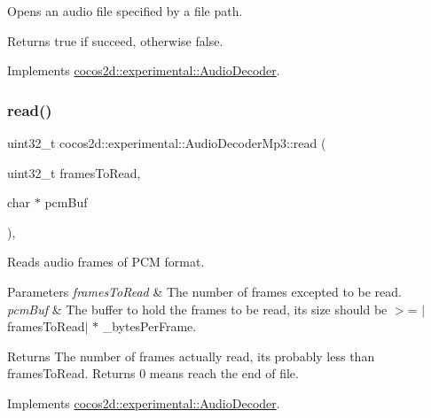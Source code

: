 Opens an audio file specified by a file path. 

\begin{DoxyReturn}{Returns}
true if succeed, otherwise false. 
\end{DoxyReturn}


Implements \hyperlink{classcocos2d_1_1experimental_1_1AudioDecoder_a27747e5f9671a16852997fe852e28e71}{cocos2d\+::experimental\+::\+Audio\+Decoder}.

\mbox{\label{classcocos2d_1_1experimental_1_1AudioDecoderMp3_a9b033167139ff6d094fe27d79a2b78ad}} 
\subsubsection{\texorpdfstring{read()}{read()}}
{\footnotesize\ttfamily uint32\+\_\+t cocos2d\+::experimental\+::\+Audio\+Decoder\+Mp3\+::read (\begin{DoxyParamCaption}\item[{uint32\+\_\+t}]{frames\+To\+Read,  }\item[{char $\ast$}]{pcm\+Buf }\end{DoxyParamCaption})\hspace{0.3cm}{\ttfamily [override]}, {\ttfamily [virtual]}}



Reads audio frames of P\+CM format. 


\begin{DoxyParams}{Parameters}
{\em frames\+To\+Read} & The number of frames excepted to be read. \\
\hline
{\em pcm\+Buf} & The buffer to hold the frames to be read, its size should be $>$= $\vert$frames\+To\+Read$\vert$ $\ast$ \+\_\+bytes\+Per\+Frame. \\
\hline
\end{DoxyParams}
\begin{DoxyReturn}{Returns}
The number of frames actually read, it\textquotesingle{}s probably less than \textquotesingle{}frames\+To\+Read\textquotesingle{}. Returns 0 means reach the end of file. 
\end{DoxyReturn}


Implements \hyperlink{classcocos2d_1_1experimental_1_1AudioDecoder_a952b42c3785402bac2166c8dd1af543c}{cocos2d\+::experimental\+::\+Audio\+Decoder}.

